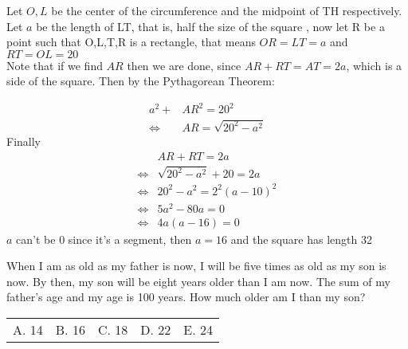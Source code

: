 \documentclass[12pt]{article}
\makeatletter
\newcounter{problem}
\newcommand{\multChoice}[5]{
    \begin{tabular}{l @{\hskip 1.5cm} l @{\hskip 1.5cm} l @{\hskip 1.5cm} l @{\hskip 1.5cm} l}
    A. #1 & B. #2 & C. #3 & D. #4 & E. #5
\end{tabular}

}
\makeatother
\begin{document}
\begin{spacing}{1.3}
\begin{solution}[E]
  Let $O,L$ be the center of the circumference and the midpoint of TH respectively.
    Let $a$ be the length of LT, that is, half the size of the square
    , now let R be a point such that O,L,T,R is a rectangle, that
    means $OR=LT=a$ and $RT=OL=20$ \\
    Note that if we find $AR$ then we are done, since $AR+RT=AT=2a$, which is a side of
    the square. Then by the Pythagorean Theorem:

    \begin{align*}
        a^2+&AR^2=20^2 \\
        \iff &AR = \sqrt{20^2-a^2} 
    \end{align*}
    Finally 
     \begin{align*}
        &AR+RT=2a \\
    \iff& \sqrt{20^2-a^2} + 20 = 2a \\
    \iff& 20^2-a^2 = 2^2(a-10)^2 \\
    \iff& 5a^2-80a=0 \\
    \iff& 4a(a-16)=0 
    \end{align*}
    $a$ can't be $0$ since it's a segment, then $a=16$ and the square has length 32
\end{solution}

\begin{problem}
      When I am as old as my father is now, I will be five times as old as my son is now. By then, my
      son will be eight years older than I am now. The sum of my father’s age and my age is 100 years.
      How much older am I than my son? \\
\multChoice{14}{16}{18}{22}{24}
\end{problem}



\end{spacing}
\end{document}

